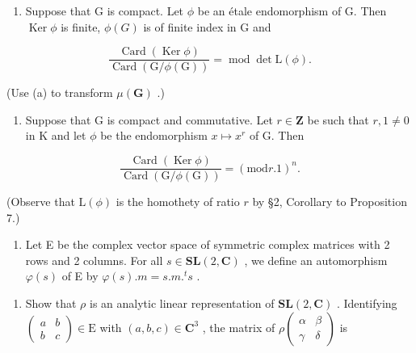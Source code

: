 \begin{enumerate}
\def\labelenumi{(\alph{enumi})}
\setcounter{enumi}{1}
\tightlist
\item
  Suppose that G is compact. Let \(\phi\) be an étale endomorphism of G. Then \(\operatorname{Ker} \phi\) is finite, \(\phi(G)\) is of finite index in G and
\end{enumerate}

\[
\frac {\operatorname{Card} (\operatorname{Ker} \phi)}{\operatorname{Card} (\mathrm{G} / \phi (\mathrm{G}))} = \operatorname{mod} \det \mathrm{L} (\phi).
\]

(Use (a) to transform \(\mu (\mathbf{G})\) .)

\begin{enumerate}
\def\labelenumi{(\alph{enumi})}
\setcounter{enumi}{2}
\tightlist
\item
  Suppose that G is compact and commutative. Let \(r \in \mathbf{Z}\) be such that \(r, 1 \neq 0\) in K and let \(\phi\) be the endomorphism \(x \mapsto x^r\) of G. Then
\end{enumerate}

\[
\frac {\operatorname{Card} (\operatorname{Ker} \phi)}{\operatorname{Card} (\mathrm{G} / \phi (\mathrm{G}))} = (\mathrm{mod} r. 1) ^ {n}.
\]

(Observe that \(\mathrm{L}(\phi)\) is the homothety of ratio \(r\) by §2, Corollary to Proposition 7.)

\begin{enumerate}
\def\labelenumi{\arabic{enumi}.}
\setcounter{enumi}{2}
\tightlist
\item
  Let E be the complex vector space of symmetric complex matrices with 2 rows and 2 columns. For all \(s \in \mathbf{SL}(2, \mathbf{C})\) , we define an automorphism \(\varphi(s)\) of E by \(\varphi(s).m = s.m.^t s\) .
\end{enumerate}

\begin{enumerate}
\def\labelenumi{(\alph{enumi})}
\tightlist
\item
  Show that \(\rho\) is an analytic linear representation of \(\mathbf{SL}(2, \mathbf{C})\) . Identifying \(\begin{pmatrix} a & b \\ b & c \end{pmatrix} \in \mathrm{E}\) with \((a, b, c) \in \mathbf{C}^3\) , the matrix of \(\rho\begin{pmatrix} \alpha & \beta \\ \gamma & \delta \end{pmatrix}\) is
\end{enumerate}

